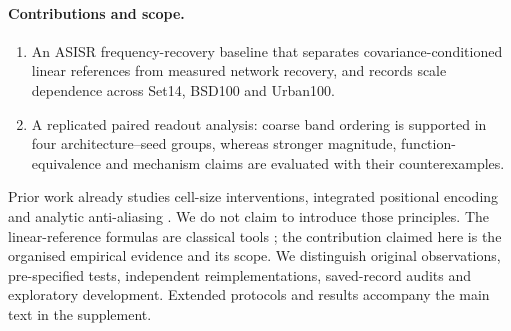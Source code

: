 \paragraph{Contributions and scope.}
\begin{enumerate}
\item An ASISR frequency-recovery baseline that separates covariance-conditioned linear references from measured network recovery, and records scale dependence across Set14, BSD100 and Urban100.
\item A replicated paired readout analysis: coarse band ordering is supported in four architecture--seed groups, whereas stronger magnitude, function-equivalence and mechanism claims are evaluated with their counterexamples.
\end{enumerate}
Prior work already studies cell-size interventions, integrated positional encoding and analytic anti-aliasing \citep{chen2021liif,liu2021ipe,becker2025thera}. We do not claim to introduce those principles. The linear-reference formulas are classical tools \citep{kay1993estimation,rasmussen2006gp}; the contribution claimed here is the organised empirical evidence and its scope. We distinguish original observations, pre-specified tests, independent reimplementations, saved-record audits and exploratory development. Extended protocols and results accompany the main text in the supplement.
